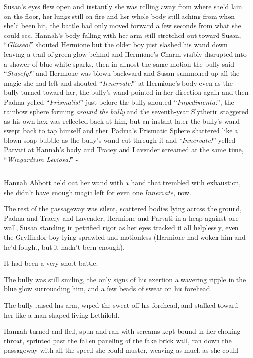 Susan's eyes flew open and instantly she was rolling away from where she'd lain on the floor, her lungs still on fire and her whole body still aching from when she'd been hit, the battle had only moved forward a few seconds from what she could see, Hannah's body falling with her arm still stretched out toward Susan, ``\emph{Glisseo!}'' shouted Hermione but the older boy just slashed his wand down leaving a trail of green glow behind and Hermione's Charm visibly disrupted into a shower of blue-white sparks, then in almost the same motion the bully said ``\emph{Stupefy!}'' and Hermione was blown backward and Susan summoned up all the magic she had left and shouted ``\emph{Innervate!}'' at Hermione's body even as the bully turned toward her, the bully's wand pointed in her direction again and then Padma yelled ``\emph{Prismatis!}'' just before the bully shouted ``\emph{Impedimenta!}'', the rainbow sphere forming \emph{around the bully} and the seventh-year Slytherin staggered as his own hex was reflected back at him, but an instant later the bully's wand swept back to tap himself and then Padma's Prismatic Sphere shattered like a blown soap bubble as the bully's wand cut through it and ``\emph{Innervate!}'' yelled Parvati at Hannah's body and Tracey and Lavender screamed at the same time, ``\emph{Wingardium Leviosa!}'' -

\begin{center}\rule{3in}{0.4pt}\end{center}

Hannah Abbott held out her wand with a hand that trembled with exhaustion, she didn't have enough magic left for even one \emph{Innervate}, now.

The rest of the passageway was silent, scattered bodies lying across the ground, Padma and Tracey and Lavender, Hermione and Parvati in a heap against one wall, Susan standing in petrified rigor as her eyes tracked it all helplessly, even the Gryffindor boy lying sprawled and motionless (Hermione had woken him and he'd fought, but it hadn't been enough).

It had been a very short battle.

The bully was still smiling, the only signs of his exertion a wavering ripple in the blue glow surrounding him, and a few beads of sweat on his forehead.

The bully raised his arm, wiped the sweat off his forehead, and stalked toward her like a man-shaped living Lethifold.

Hannah turned and fled, spun and ran with screams kept bound in her choking throat, sprinted past the fallen paneling of the fake brick wall, ran down the passageway with all the speed she could muster, weaving as much as she could -

